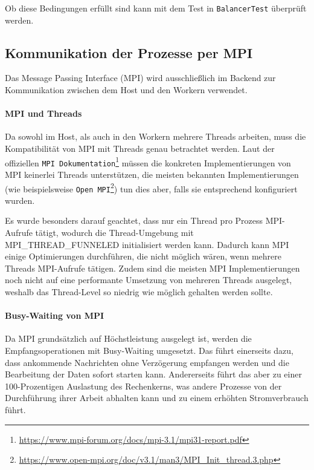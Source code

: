 Ob diese Bedingungen erfüllt sind kann mit dem Test in \verb|BalancerTest| überprüft werden.

\subsection{Kommunikation der Prozesse per MPI}\label{sec:mpi}


Das Message Passing Interface (MPI) wird ausschließlich im Backend zur Kommunikation zwischen dem Host und den Workern verwendet.

\paragraph{MPI und Threads}

Da sowohl im Host, als auch in den Workern mehrere Threads arbeiten, muss die Kompatibilität von MPI mit Threads genau betrachtet werden. Laut der offiziellen \verb|MPI Dokumentation|\footnote{\url{https://www.mpi-forum.org/docs/mpi-3.1/mpi31-report.pdf}} müssen die konkreten Implementierungen von MPI keinerlei Threads unterstützen, die meisten bekannten Implementierungen (wie beispielsweise \verb|Open MPI|\footnote{\url{https://www.open-mpi.org/doc/v3.1/man3/MPI_Init_thread.3.php}}) tun dies aber, falls sie entsprechend konfiguriert wurden.

Es wurde besonders darauf geachtet, dass nur ein Thread pro Prozess MPI-Aufrufe tätigt, wodurch die Thread-Umgebung mit MPI\_THREAD\_FUNNELED initialisiert werden kann. Dadurch kann MPI einige Optimierungen durchführen, die nicht möglich wären, wenn mehrere Threads MPI-Aufrufe tätigen. Zudem sind die meisten MPI Implementierungen noch nicht auf eine performante Umsetzung von mehreren Threads ausgelegt, weshalb das Thread-Level so niedrig wie möglich gehalten werden sollte.

\paragraph{Busy-Waiting von MPI}\label{para:mpi_busy_waiting}

Da MPI grundsätzlich auf Höchstleistung ausgelegt ist, werden die Empfangsoperationen mit Busy-Waiting umgesetzt. Das führt einerseits dazu, dass ankommende Nachrichten ohne Verzögerung empfangen werden und die Bearbeitung der Daten sofort starten kann. Andererseits führt das aber zu einer 100-Prozentigen Auslastung des Rechenkerns, was andere Prozesse von der Durchführung ihrer Arbeit abhalten kann und zu einem erhöhten Stromverbrauch führt.

